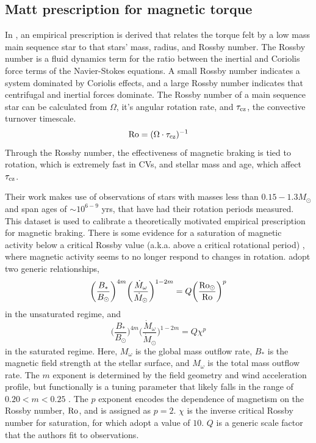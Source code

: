 \subsection{Matt prescription for magnetic torque}
\label{sect:introduction:matt braking}

In \citet{matt2015}, an empirical prescription is derived that relates the torque felt by a low mass main sequence star to that stars' mass, radius, and Rossby number. The Rossby number is a fluid dynamics term for the ratio between the inertial and Coriolis force terms of the Navier-Stokes equations. A small Rossby number indicates a system dominated by Coriolis effects, and a large Rossby number indicates that centrifugal and inertial forces dominate. The Rossby number of a main sequence star can be calculated from $\Omega$, it's angular rotation rate, and $\tau_{\rm cz}$, the convective turnover timescale.
\begin{equation}
    \label{eqn:introduction:rossby number}
    {\rm Ro} = (\Omega \cdot \tau_{\rm cz})^{-1}
\end{equation}
Through the Rossby number, the effectiveness of magnetic braking is tied to rotation, which is extremely fast in CVs, and stellar mass and age, which affect $\tau_{\rm cz}$.

Their work makes use of observations of stars with masses less than $0.15 - 1.3 M_\odot$ and span ages of $\sim 10^{6-9}$ yrs, that have had their rotation periods measured. This dataset is used to calibrate a theoretically motivated empirical prescription for magnetic braking. There is some evidence for a saturation of magnetic activity below a critical Rossby value (a.k.a. above a critical rotational period) \citep{reiners2009}, where magnetic activity seems to no longer respond to changes in rotation. \citet{matt2015} adopt two generic relationships, 
\begin{equation}
    \bigg(\frac{B_*}{B_\odot}\bigg)^{4m} \bigg(\frac{\dot M_\omega}{\dot M_\odot}\bigg)^{1-2m} = Q \bigg(\frac{\rm Ro_\odot}{\rm Ro} \bigg)^{p}
\end{equation}
in the unsaturated regime, and 
\begin{equation}
    \bigg(\frac{B_*}{B_\odot}\bigg)^{4m} \bigg(\frac{\dot M_\omega}{\dot M_\odot}\bigg)^{1-2m} = Q \chi^{p}
\end{equation}
in the saturated regime. Here, $M_\omega$ is the global mass outflow rate, $B_*$ is the magnetic field strength at the stellar surface, and $M_\omega$ is the total mass outflow rate. The $m$ exponent is determined by the field geometry and wind acceleration profile, but functionally is a tuning parameter that likely falls in the range of $0.20 < m < 0.25$ \citep{matt2015}. The $p$ exponent encodes the dependence of magnetism on the Rossby number, $\rm Ro$, and is assigned as $p = 2$. $\chi$ is the inverse critical Rossby number for saturation, for which \citet{matt2015} adopt a value of $10$. $Q$ is a generic scale factor that the authors fit to observations.

